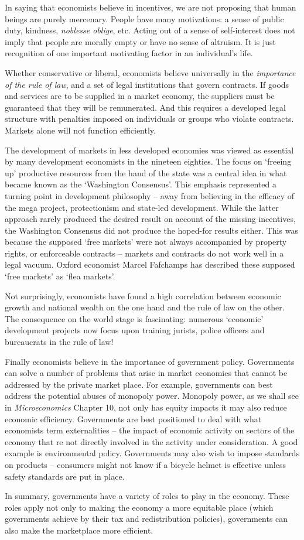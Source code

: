 In saying that economists believe in incentives, we are not proposing that human beings are purely mercenary. People have many motivations: a sense of public duty, kindness, \textit{noblesse oblige}, etc. Acting out of a sense of self-interest does not imply that people are morally empty or have no sense of altruism. It is just recognition of one important motivating factor in an individual's life.

Whether conservative or liberal, economists believe universally in the \textit{importance of the rule of law}, and a set of legal institutions that govern contracts. If goods and services are to be supplied in a market economy, the suppliers must be guaranteed that they will be remunerated. And this requires a developed legal structure with penalties imposed on individuals or groups who violate contracts. Markets alone will not function efficiently. 

The development of markets in less developed economies was viewed as essential by many development economists in the nineteen eighties. The focus on `freeing up' productive resources from the hand of the state was a central idea in what became known as the `Washington Consensus'. This emphasis represented a turning point in development philosophy -- away from believing in the efficacy of the mega project, protectionism and state-led development. While the latter approach rarely produced the desired result on account of the missing incentives, the Washington Consensus did not produce the hoped-for results either. This was because the supposed `free markets' were not always accompanied by property rights, or enforceable contracts -- markets and contracts do not work well in a legal vacuum. Oxford economist Marcel Fafchamps has described these supposed `free markets' as `flea markets'. 

Not surprisingly, economists have found a high correlation between economic growth and national wealth on the one hand and the rule of law on the other. The consequence on the world stage is fascinating: numerous `economic' development projects now focus upon training jurists, police officers and bureaucrats in the rule of law!

Finally economists believe in the importance of government policy. Governments can solve a number of problems that arise in market economies that cannot be addressed by the private market place. For example, governments can best address the potential abuses of monopoly power. Monopoly power, as we shall see in \textit{Microeconomics} Chapter 10, not only has equity impacts it may also reduce economic efficiency. Governments are best positioned to deal with what economists term externalities -- the impact of economic activity on sectors of the economy that re not directly involved in the activity under consideration. A good example is environmental policy. Governments may also wish to impose standards on products -- consumers might not know if a bicycle helmet is effective unless safety standards are put in place.

In summary, governments have a variety of roles to play in the economy. These roles apply not only to making the economy a more equitable place (which governments achieve by their tax and redistribution policies), governments can also make the marketplace more efficient.